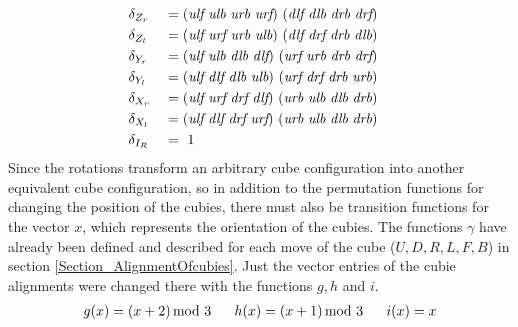 \begin{alignat*}{2}
& \delta_{Z_r} && = ( \textit{ulf} \ \textit{ulb} \ \textit{urb} \ \textit{urf})\ (\textit{dlf} \ \textit{dlb} \ \textit{drb} \ \textit{drf} )\\
& \delta_{Z_l} && = ( \textit{ulf} \ \textit{urf} \ \textit{urb} \ \textit{ulb})\ (\textit{dlf} \ \textit{drf} \ \textit{drb} \ \textit{dlb} )\\
& \delta_{Y_r} && = ( \textit{ulf} \ \textit{ulb} \ \textit{dlb} \ \textit{dlf})\ ( \textit{urf} \ \textit{urb} \ \textit{drb} \ \textit{drf} )\\
& \delta_{Y_l} && = ( \textit{ulf} \ \textit{dlf} \ \textit{dlb} \ \textit{ulb})\ ( \textit{urf} \ \textit{drf} \ \textit{drb} \ \textit{urb} )\\
& \delta_{X_r} && = ( \textit{ulf} \ \textit{urf} \ \textit{drf} \ \textit{dlf})\ ( \textit{urb} \ \textit{ulb} \ \textit{dlb} \ \textit{drb} )\\
& \delta_{X_l} && = ( \textit{ulf} \ \textit{dlf} \ \textit{drf} \ \textit{urf})\ (\textit{urb} \ \textit{ulb} \ \textit{dlb} \ \textit{drb} )\\
& \delta_{I_R} && = \ 1 \hspace*{14.1em}
\end{alignat*}
Since the rotations transform an arbitrary cube configuration into another equivalent cube configuration, so in addition to the permutation functions for changing the position of the cubies, there must also be transition functions for the vector $x$, which represents the orientation of the cubies. The functions $\gamma$ have already been defined and described for each move of the cube ($U, D, R, L, F, B$) in section \ref{Section_AlignmentOfcubies}. Just the vector entries of the cubie alignments were changed there with the functions $g, h$ and $i$.
\begin{align*}
g(x)=(x + 2) \hspace*{-0.5em} \mod 3 \ \ \ \ \ h(x) = (x+1) \hspace*{-0.5em} \mod 3 \ \ \ \ \ i(x)=x
\end{align*}

